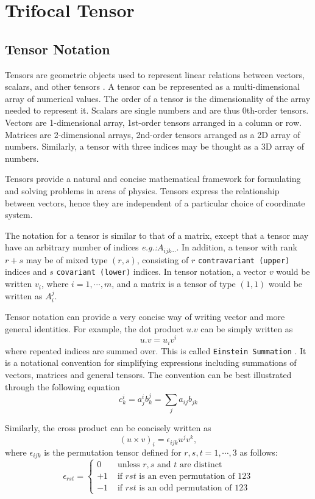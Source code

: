 \section{Trifocal Tensor}
\subsection{Tensor Notation}
Tensors are geometric objects used to represent linear relations between vectors, scalars, and other tensors \cite{weisstein1}. A tensor can be represented as a multi-dimensional array of numerical values. The order of a tensor is the dimensionality of the array needed to represent it. Scalars are single numbers and are thus 0th-order tensors. Vectors are 1-dimensional array, 1st-order tensors arranged in a column or row. Matrices are 2-dimensional arrays, 2nd-order tensors arranged as a 2D array of numbers. Similarly, a tensor with three indices may be thought as a 3D array of numbers.

Tensors provide a natural and concise mathematical framework for formulating and solving problems in areas of physics. Tensors express the relationship between vectors, hence they are independent of a particular choice of coordinate system.

The notation for a tensor is similar to that of a matrix, except that a tensor may have an arbitrary number of indices \textit{e.g.:}$A_{ijk\dotsb}$. In addition, a tensor with rank $r+s$ may be of mixed type $(r,s)$, consisting of $r$ \texttt{contravariant (upper)} indices and $s$ \texttt{covariant (lower)} indices. In tensor notation, a vector $v$ would be written $v_i$, where $i =1,\dotsb,m$, and a matrix is a tensor of type $(1,1)$ would be written as $A^{j}_{i}$.

Tensor notation can provide a very concise way of writing vector and more general identities. For example, the dot product $u.v$ can be simply written as
$$
u.v = u_{i}v^{i}
$$
where repeated indices are summed over. This is called \texttt{Einstein Summation} \cite{weisstein2}. It is a notational convention for simplifying expressions including summations of vectors, matrices and general tensors. The convention can be best illustrated through the following equation
$$
  c^{i}_{k} = a^{i}_{j}b^{j}_{k} = \sum_{j} a_{ij}b_{jk}
$$

Similarly, the cross product can be concisely written as
$$
  (u\times v)_{i} = \epsilon_{ijk} u^{j} v^{k},
$$
where $\epsilon_{ijk}$ is the permutation tensor defined for $r,s,t =1,\dotsb,3$ as follows:
$$
\epsilon_{rst} = \begin{cases}
  0 & \text{ unless } r,s \text{ and } t \text{ are distinct}\\
  +1 & \text{ if } rst \text{ is an even permutation of } 123\\
  -1 & \text{ if } rst \text{ is an odd permutation of } 123
\end{cases}
$$

